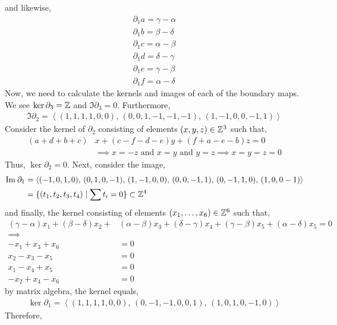\documentclass[12pt]{extarticle}
\begin{document}
and likewise,
\begin{align*}
\partial_1 a = \gamma - \alpha
\\
\partial_1 b = \beta - \delta
\\
\partial_1 c = \alpha - \beta
\\
\partial_1 d = \delta - \gamma
\\
\partial_1 e = \gamma - \beta
\\
\partial_1 f = \alpha - \delta
\end{align*}
Now, we need to calculate the kernels and images of each of the boundary maps. We see $\ker{\partial_3} = \mathbb{Z}$ and $\Im{\partial_3} = 0$. Furthermore,
\begin{align*}
\Im{\partial_2} = \left< (1, 1, 1, 1, 0, 0), \, (0, 0, 1, -1, -1, -1), \, (1, -1, 0, 0, -1, 1) \right>
\end{align*}
Consider the kernel of $\partial_2$ consisting of elements $(x,y,z) \in \mathbb{Z}^3$ such that,
\begin{align*}
(a + d + b + c) & x + (c - f - d - e) y + (f + a - e - b)z = 0 
\\
& \implies x = -z \text{ and } x = y \text{ and } y = z \implies x = y = z = 0
\end{align*}
Thus, $\ker{\partial_2} = 0$. Next, consider the image,
\begin{align*}
\mathrm{Im} \: \partial_1 & = \left< (-1,0,1,0), \, (0,1,0,-1), \, (1,-1,0,0), \, (0,0,-1,1), \, (0,-1,1,0), \, (1,0,0-1) \right> 
\\
& = \{(t_1, t_2, t_3, t_4) \mid \sum t_i = 0 \} \subset \mathbb{Z}^4 
\end{align*}
and finally, the kernel consisting of elements $(x_1, \dots, x_6) \in \mathbb{Z}^6$ such that,
\begin{align*}
(\gamma - \alpha)  x_1 + (\beta - \delta)x_2 + & (\alpha - \beta) x_3 + (\delta - \gamma) x_4 + (\gamma - \beta) x_5 + (\alpha - \delta) x_5 = 0
\\
\implies \quad \quad \quad \quad \quad \quad \quad &
\\
 -x_1 + x_3 + x_6 & = 0
\\
 x_2 - x_3 - x_5 & = 0
\\
 x_1 - x_4 + x_5 & = 0
\\
 -x_2 + x_4 - x_6 & = 0  
\end{align*}
by matrix algebra, the kernel equals,
\begin{align*}
\ker{\partial_1} = \left< (1,1,1,1,0,0), \, (0,-1,-1,0,0,1), \, (1,0,1,0,-1,0) \right> 
\end{align*}
Therefore,
\end{document}

